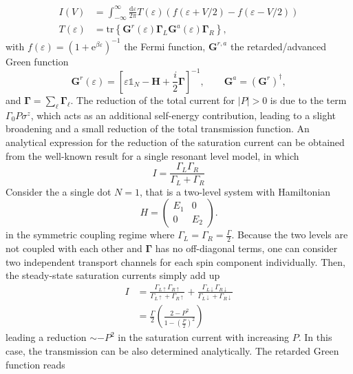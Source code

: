\documentclass{article}
\newcommand{\exP}[1]{\mathrm{e}^{#1}}
\newcommand{\dif}{\mathrm{d}}
\renewcommand{\vec}[1]{\mathbf{#1}}
\newcommand{\tr}[1]{\mathrm{tr}\left\{#1\right\}}
\begin{document}
\begin{align}
	I(V) &= \int_{-\infty}^\infty \frac{\dif \varepsilon}{2\pi} T(\varepsilon) (f(\varepsilon+V/2)-f(\varepsilon-V/2))\\
	T(\varepsilon) &= \tr{\vec{G}^r(\varepsilon)\bm{\Gamma}_L\vec{G}^a(\varepsilon)\bm{\Gamma}_R},
\end{align}
with $f(\varepsilon)= (1+\exP{\beta\varepsilon})^{-1}$ the Fermi function, $\vec{G}^{r,a}$ the retarded/advanced Green function
\begin{equation}
	\vec{G}^r(\varepsilon) = \left[\varepsilon\mathbb{1}_N - \vec{H}+ \frac{i}{2}\bm{\Gamma}\right]^{-1}, \qquad \vec{G}^a = (\vec{G}^r)^\dagger,
\end{equation}
and $\bm{\Gamma} =\sum_\ell \bm{\Gamma}_\ell$. 
The reduction of the total current for $\vert P \vert>0$ is due to the term $\Gamma_0 P \sigma^z$, which acts as an additional self-energy contribution, leading to a slight broadening and a small reduction of the total transmission function. 
An analytical expression for the reduction of the saturation current can be obtained from the well-known result for a single resonant level model, in which 
\begin{equation}
	I = \frac{\Gamma_L\Gamma_R}{\Gamma_L + \Gamma_R}
\end{equation}
Consider the a single dot $N=1$, that is a two-level system with Hamiltonian
\begin{equation}
	H = \begin{pmatrix}
		E_1 & 0 \\
		0 & E_2
	\end{pmatrix}.
\end{equation}
in the symmetric coupling regime where $\Gamma_L= \Gamma_R=\frac{\Gamma}{2}$. 
Because the two levels are not coupled with each other and $\bm{\Gamma}$ has no off-diagonal terms, one can consider two independent transport channels for each spin component individually. Then, the steady-state saturation currents simply add up
\begin{align}
	I &= \frac{\Gamma_{L\uparrow} \Gamma_{R\uparrow}}{\Gamma_{L\uparrow}+ \Gamma_{R\uparrow}} + \frac{\Gamma_{L\downarrow} \Gamma_{R\downarrow}}{\Gamma_{L\downarrow}+ \Gamma_{R\downarrow}}\\
	&= \frac{\Gamma}{2}\left(\frac{2-P^2}{1-\left(\frac{P}{2}\right)^2}\right)\label{eq:Cur_Analytical_infinityBias}
\end{align} 
leading a reduction $\sim -P^2$ in the saturation current with increasing $P$. 
In this case, the transmission can be also determined analytically. The retarded Green function reads
\end{document}
